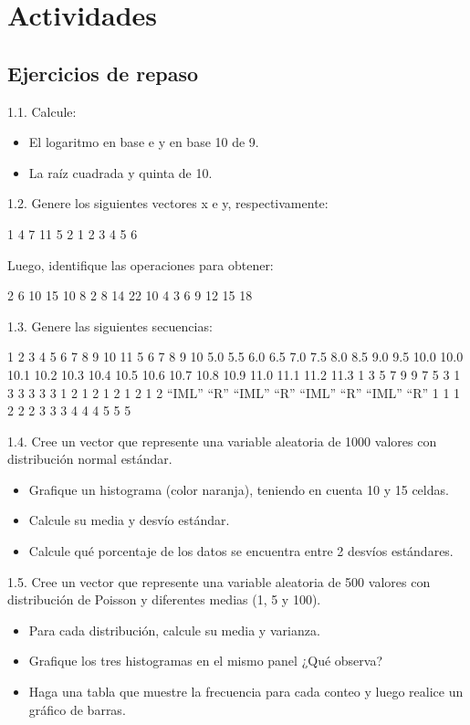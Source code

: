 \documentclass[
]{book}
\begin{document}
\hypertarget{actividades}{%
\section{Actividades}\label{actividades}}

\hypertarget{ejercicios-de-repaso}{%
\subsection{Ejercicios de repaso}\label{ejercicios-de-repaso}}

1.1. Calcule:

\begin{itemize}
\item
  El logaritmo en base e y en base 10 de 9.
\item
  La raíz cuadrada y quinta de 10.
\end{itemize}

1.2. Genere los siguientes vectores x e y, respectivamente:

1 4 7 11 5 2
1 2 3 4 5 6

Luego, identifique las operaciones para obtener:

2 6 10 15 10 8
2 8 14 22 10 4
3 6 9 12 15 18

1.3. Genere las siguientes secuencias:

1 2 3 4 5 6 7 8 9 10 11
5 6 7 8 9 10
5.0 5.5 6.0 6.5 7.0 7.5 8.0 8.5 9.0 9.5 10.0
10.0 10.1 10.2 10.3 10.4 10.5 10.6 10.7 10.8 10.9 11.0 11.1 11.2 11.3
1 3 5 7 9
9 7 5 3 1
3 3 3 3 3
1 2 1 2 1 2 1 2 1 2
``IML'' ``R'' ``IML'' ``R'' ``IML'' ``R'' ``IML'' ``R''
1 1 1 2 2 2 3 3 3 4 4 4 5 5 5

1.4. Cree un vector que represente una variable aleatoria de 1000 valores con distribución normal estándar.

\begin{itemize}
\item
  Grafique un histograma (color naranja), teniendo en cuenta 10 y 15 celdas.
\item
  Calcule su media y desvío estándar.
\item
  Calcule qué porcentaje de los datos se encuentra entre 2 desvíos estándares.
\end{itemize}

1.5. Cree un vector que represente una variable aleatoria de 500 valores con distribución de Poisson y diferentes medias (1, 5 y 100).

\begin{itemize}
\item
  Para cada distribución, calcule su media y varianza.
\item
  Grafique los tres histogramas en el mismo panel ¿Qué observa?
\item
  Haga una tabla que muestre la frecuencia para cada conteo y luego realice un gráfico de barras.
\end{itemize}
\end{document}
